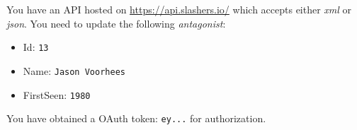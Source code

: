
\pgfmathsetmacro{}

You have an API hosted on \url{https://api.slashers.io/} which accepts either \textit{xml} or \textit{json}.
\noindent You need to update the following \textit{antagonist}:
\begin{itemize}
    \item Id: \texttt{13}
    \item Name: \texttt{Jason Voorhees}
    \item FirstSeen: \texttt{1980}
\end{itemize}
\noindent You have obtained a OAuth token: \texttt{ey...} for authorization.





